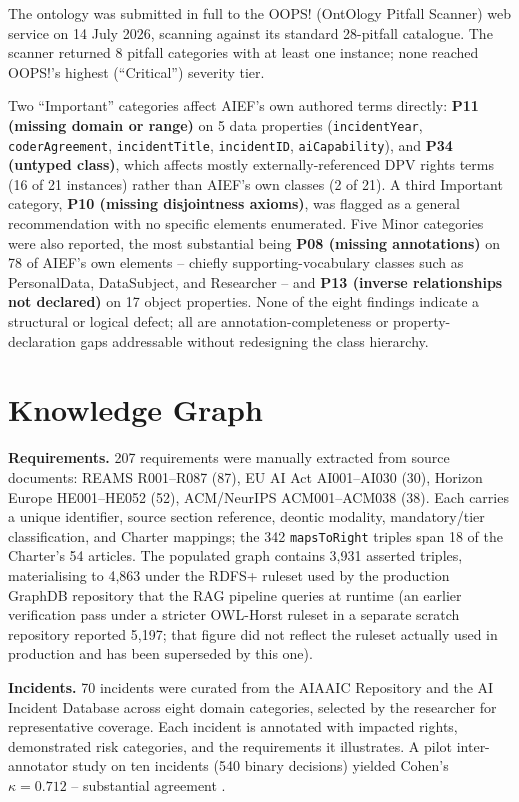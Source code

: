 \documentclass[a4paper,oneside,12pt]{book}
\numberwithin{equation}{chapter}
\begin{document}
The ontology was submitted in full to the OOPS! (OntOlogy Pitfall Scanner) web service \cite{poveda2014oops} on 14 July 2026, scanning against its standard 28-pitfall catalogue. The scanner returned 8 pitfall categories with at least one instance; none reached OOPS!'s highest (``Critical'') severity tier.

Two ``Important'' categories affect AIEF's own authored terms directly: \textbf{P11 (missing domain or range)} on 5 data properties (\texttt{incidentYear}, \texttt{coderAgreement}, \texttt{incidentTitle}, \texttt{incidentID}, \texttt{aiCapability}), and \textbf{P34 (untyped class)}, which affects mostly externally-referenced DPV rights terms (16 of 21 instances) rather than AIEF's own classes (2 of 21). A third Important category, \textbf{P10 (missing disjointness axioms)}, was flagged as a general recommendation with no specific elements enumerated. Five Minor categories were also reported, the most substantial being \textbf{P08 (missing annotations)} on 78 of AIEF's own elements -- chiefly supporting-vocabulary classes such as \textsf{PersonalData}, \textsf{DataSubject}, and \textsf{Researcher} -- and \textbf{P13 (inverse relationships not declared)} on 17 object properties. None of the eight findings indicate a structural or logical defect; all are annotation-completeness or property-declaration gaps addressable without redesigning the class hierarchy.

\section{Knowledge Graph}

\textbf{Requirements.} 207 requirements were manually extracted from source documents: REAMS R001--R087 (87), EU AI Act AI001--AI030 (30), Horizon Europe HE001--HE052 (52), ACM/NeurIPS ACM001--ACM038 (38). Each carries a unique identifier, source section reference, deontic modality, mandatory/tier classification, and Charter mappings; the 342 \texttt{mapsToRight} triples span 18 of the Charter's 54 articles. The populated graph contains 3,931 asserted triples, materialising to 4,863 under the RDFS+ ruleset used by the production GraphDB repository that the RAG pipeline queries at runtime (an earlier verification pass under a stricter OWL-Horst ruleset in a separate scratch repository reported 5,197; that figure did not reflect the ruleset actually used in production and has been superseded by this one).

\textbf{Incidents.} 70 incidents were curated from the AIAAIC Repository \cite{aiaaic2024} and the AI Incident Database \cite{aiid2024} across eight domain categories, selected by the researcher for representative coverage. Each incident is annotated with impacted rights, demonstrated risk categories, and the requirements it illustrates. A pilot inter-annotator study on ten incidents (540 binary decisions) yielded Cohen's $\kappa = 0.712$ -- substantial agreement \cite{landiskoch1977}.
\end{document}
